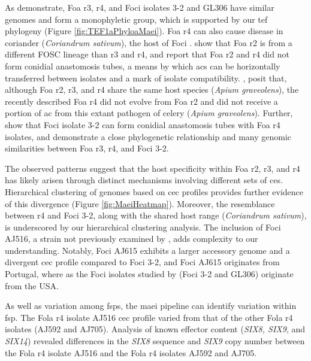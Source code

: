 As \textcite{Henry2020} demonstrate, \ac{Foa} \ac{r3}, \ac{r4}, and \ac{Foci} isolates 3-2 and GL306 have similar genomes and form a monophyletic group, which is supported by our \ac{tef} phylogeny (Figure \ref{fig:TEF1aPhyloaMaei}). \ac{Foa} \ac{r4} can also cause disease in coriander (\textit{Coriandrum sativum}), the host of \ac{Foci} \parencite{Epstein2022}. \textcite{Henry2020, Epstein2022} show that \ac{Foa} \ac{r2} is from a different \ac{FOSC} lineage than \ac{r3} and \ac{r4}, and report that \ac{Foa} \ac{r2} and \ac{r4} did not form conidial anastomosis tubes, a means by which \acp{ac} can be horizontally transferred between isolates and a mark of isolate compatibility. \textcite{Epstein2022}, posit that, although \ac{Foa} \ac{r2}, \ac{r3}, and \ac{r4} share the same host species (\textit{Apium graveolens}), the recently described \ac{Foa} \ac{r4} did not evolve from \ac{Foa} \ac{r2} and did not receive a portion of \ac{ac} from this extant pathogen of celery (\textit{Apium graveolens}). Further, \textcite{Epstein2022} show that \ac{Foci} isolate 3-2 can form conidial anastomosis tubes with \ac{Foa} \ac{r4} isolates, and \textcite{Henry2020} demonstrate a close phylogenetic relationship and many genomic similarities between \ac{Foa} \ac{r3}, \ac{r4}, and \ac{Foci} 3-2. 

The observed patterns suggest that the host specificity within \ac{Foa} \ac{r2}, \ac{r3}, and \ac{r4} has likely arisen through distinct mechanisms involving different sets of \acp{ce}. Hierarchical clustering of genomes based on \ac{cec} profiles provides further evidence of this divergence (Figure \ref{fig:MaeiHeatmap}). Moreover, the resemblance between \ac{r4} and \ac{Foci} 3-2, along with the shared host range (\textit{Coriandrum sativum}), is underscored by our hierarchical clustering analysis. The inclusion of \ac{Foci} AJ516, a strain not previously examined by \textcite{Henry2020, Epstein2022}, adds complexity to our understanding. Notably, \ac{Foci} AJ615 exhibits a larger accessory genome and a divergent \ac{cec} profile compared to \ac{Foci} 3-2, and \ac{Foci} AJ615 originates from Portugal, where as the \ac{Foci} isolates studied by \textcite{Henry2020, Epstein2022} (\ac{Foci} 3-2 and GL306) originate from the USA. 

As well as variation among \acp{fsp}, the \ac{maei} pipeline can identify variation within \ac{fsp}. The \ac{Fola} \ac{r4} isolate AJ516 \ac{cec} profile varied from that of the other \ac{Fola} \ac{r4} isolates (AJ592 and AJ705). Analysis of known effector content (\textit{SIX8, SIX9}, and \textit{SIX14}) revealed differences in the \textit{SIX8} sequence and \textit{SIX9} copy number between the \ac{Fola} \ac{r4} isolate AJ516 and the \ac{Fola} \ac{r4} isolates AJ592 and AJ705. 

